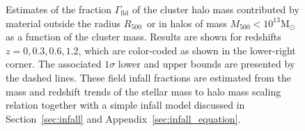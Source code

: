 \documentclass[useAMS,usenatbib,iop,numberedappendix]{mn2e}
\newcommand{\Msun}{\ensuremath{\mathrm{M}_{\odot}}}
\newcommand{\Rfiveoo}{\ensuremath{R_{500}}}
\newcommand{\Mfiveoo}{\ensuremath{M_{500}}}
\newcommand{\redshift}{\ensuremath{z}}
\begin{document}
%
\begin{figure}
\vskip-0.20in
\centering
{}
\vskip-0.1in
\caption{
Estimates of the fraction $\Gamma_{\mathrm{fld}}$ of the cluster halo mass contributed by material outside the radius \Rfiveoo\ or in halos of mass 
$\Mfiveoo<10^{13}\Msun$ as a function of the cluster mass. 
Results are shown for redshifts $\redshift=0, 0.3, 0.6, 1.2$, which are color-coded as shown in the lower-right corner.
The associated $1\sigma$ lower and upper bounds are presented by the dashed lines. 
These field infall fractions are estimated from the mass and redshift trends of the stellar mass to halo mass scaling relation together with a simple infall model discussed in Section~\ref{sec:infall} and Appendix~\ref{sec:infall_equation}. 
}
\label{fig:infall}
\end{figure}
%
\end{document}
